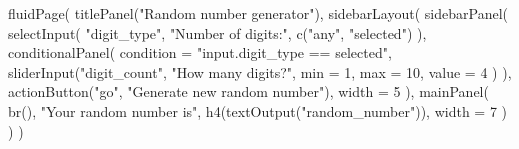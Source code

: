 \documentclass[
  letterpaper,
  DIV=11,
  numbers=noendperiod]{scrreprt}
\newenvironment{Shaded}{\begin{snugshade}}{\end{snugshade}}
\newcommand{\AttributeTok}[1]{\textcolor[rgb]{0.40,0.46,0.14}{#1}}
\newcommand{\ControlFlowTok}[1]{\textcolor[rgb]{0.00,0.46,0.62}{#1}}
\newcommand{\DecValTok}[1]{\textcolor[rgb]{0.68,0.00,0.00}{#1}}
\newcommand{\FunctionTok}[1]{\textcolor[rgb]{0.28,0.35,0.67}{#1}}
\newcommand{\NormalTok}[1]{\textcolor[rgb]{0.00,0.46,0.62}{#1}}
\newcommand{\OtherTok}[1]{\textcolor[rgb]{0.00,0.46,0.62}{#1}}
\newcommand{\SpecialCharTok}[1]{\textcolor[rgb]{0.37,0.37,0.37}{#1}}
\newcommand{\StringTok}[1]{\textcolor[rgb]{0.13,0.47,0.30}{#1}}
\begin{document}
\begin{Shaded}
\begin{Highlighting}[]
\FunctionTok{fluidPage}\NormalTok{(}
  \FunctionTok{titlePanel}\NormalTok{(}\StringTok{"Random number generator"}\NormalTok{),}
  \FunctionTok{sidebarLayout}\NormalTok{(}
    \FunctionTok{sidebarPanel}\NormalTok{(}
      \FunctionTok{selectInput}\NormalTok{(}
        \StringTok{"digit\_type"}\NormalTok{, }\StringTok{"Number of digits:"}\NormalTok{,}
        \FunctionTok{c}\NormalTok{(}\StringTok{"any"}\NormalTok{, }\StringTok{"selected"}\NormalTok{)}
\NormalTok{      ),}
      \FunctionTok{conditionalPanel}\NormalTok{(}
        \AttributeTok{condition =} \StringTok{"input.digit\_type == \textquotesingle{}selected\textquotesingle{}"}\NormalTok{,}
        \FunctionTok{sliderInput}\NormalTok{(}\StringTok{"digit\_count"}\NormalTok{, }\StringTok{"How many digits?"}\NormalTok{,}
          \AttributeTok{min =} \DecValTok{1}\NormalTok{, }\AttributeTok{max =} \DecValTok{10}\NormalTok{, }\AttributeTok{value =} \DecValTok{4}
\NormalTok{        )}
\NormalTok{      ),}
      \FunctionTok{actionButton}\NormalTok{(}\StringTok{"go"}\NormalTok{, }\StringTok{"Generate new random number"}\NormalTok{),}
      \AttributeTok{width =} \DecValTok{5}
\NormalTok{    ),}
    \FunctionTok{mainPanel}\NormalTok{(}
      \FunctionTok{br}\NormalTok{(),}
      \StringTok{"Your random number is"}\NormalTok{,}
      \FunctionTok{h4}\NormalTok{(}\FunctionTok{textOutput}\NormalTok{(}\StringTok{"random\_number"}\NormalTok{)),}
      \AttributeTok{width =} \DecValTok{7}
\NormalTok{    )}
\NormalTok{  )}
\NormalTok{)}
\end{Highlighting}
\end{Shaded}

\begin{Shaded}
\end{Shaded}
\end{document}
